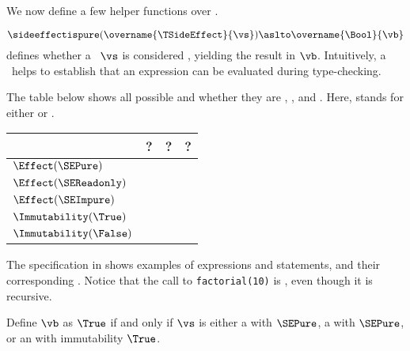 We now define a few helper functions over \sideeffectdescriptorsterm.

\hypertarget{relation-sideeffectispure}{}
\[
    \sideeffectispure(\overname{\TSideEffect}{\vs}) \aslto \overname{\Bool}{\vb}
\]
defines whether a \sideeffectdescriptorterm\ $\vs$ is considered \emph{\pureterm},
yielding the result in $\vb$.
Intuitively, a \emph{\pureterm} \sideeffectdescriptorterm\ helps to establish that
an expression can be evaluated during type-checking.

The table below shows all possible \sideeffectdescriptorsterm{} and whether they are \pureterm{}, \readonlyterm{}, and \symbolicallyevaluableterm{}.
Here, \Effect{} stands for either \LocalEffect{} or \GlobalEffect{}.

\begin{center}
\begin{tabular}{llll}
\textbf{\sideeffectdescriptorterm{}} & \textbf{\pureterm{}?} & \textbf{\readonlyterm{}?} & \textbf{\symbolicallyevaluableterm{}?}\\
\hline
$\Effect(\SEPure)$      & \True{}  & \True{}  & \True{}  \\
$\Effect(\SEReadonly)$  & \False{} & \True{}  & \True{}  \\
$\Effect(\SEImpure)$    & \False{} & \False{} & \False{} \\
$\Immutability(\True)$  & \True{}  & \True{}  & \True{}  \\
$\Immutability(\False)$ & \False{} & \True{}  & \False{} \\
\end{tabular}
\end{center}

The specification in  shows examples of expressions
and statements, and their corresponding \sideeffectdescriptorsterm{}.
Notice that the call to \verb|factorial(10)| is \readonlyterm, even though it is recursive.


\ProseParagraph
Define $\vb$ as $\True$ if and only if $\vs$ is either
    a \LocalEffectTerm{} with \purity{} $\SEPure$,
    a \GlobalEffectTerm{} with \purity{} $\SEPure$,
    or an \ImmutabilityTerm{} with immutability $\True$.

